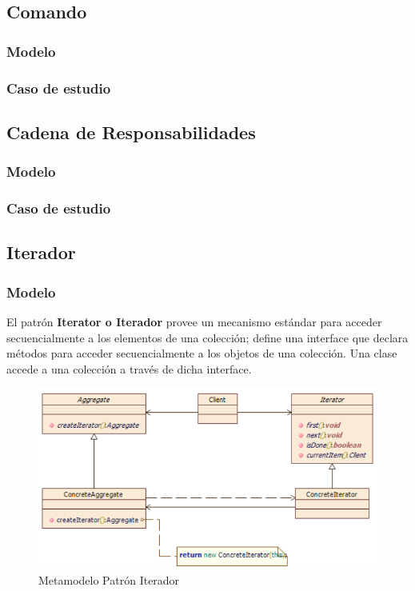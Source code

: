 \subsection{Comando}
\subsubsection{Modelo}
\newpage
\subsubsection{Caso de estudio}
\newpage

\subsection{Cadena de Responsabilidades}
\subsubsection{Modelo}
\newpage
\subsubsection{Caso de estudio}
\newpage

\subsection{Iterador}
\subsubsection{Modelo}
El patrón \textbf{Iterator o Iterador} provee un mecanismo estándar para acceder secuencialmente a los elementos de una colección; define una interface que declara métodos para acceder secuencialmente a los objetos de una colección. Una clase accede a una colección a través de dicha interface.

\begin{figure}[th!]
	\centering
	\includegraphics[width=0.8\linewidth]{arquitectura/imagenes/modeloIterador}
	\caption{Metamodelo Patrón Iterador}
	\label{fig:metamodelo patron iterador}
\end{figure}

